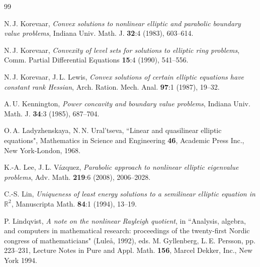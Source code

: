\documentclass[12pt]{amsart}
\numberwithin{equation}{section}
\theoremstyle{plain}
\theoremstyle{plain}
\theoremstyle{plain}
\theoremstyle{definition}
\newcommand{\R}{{\mathbb R}}
\begin{document}
\begin{thebibliography}{99}

N.$\,$J. Korevaar,
\emph{Convex solutions to nonlinear elliptic and parabolic boundary value problems},
Indiana Univ. Math. J. \textbf{32}:4 (1983), 603--614.

N.$\,$J. Korevaar, %
\emph{Convexity of level sets for solutions to elliptic ring problems},
Comm. Partial Differential Equations \textbf{15}:4 (1990), 541--556.

N.$\,$J. Korevaar, J.$\,$L. Lewis, 
 \emph{Convex solutions of certain elliptic equations have constant rank Hessian},
Arch. Ration. Mech. Anal. \textbf{97}:1 (1987), 19--32.

A.$\,$U. Kennington,
\emph{Power concavity and boundary value problems},
Indiana Univ. Math. J. \textbf{34}:3 (1985), 687--704.




O.$\,$A. Ladyzhenskaya, N.$\,$N. Ural'tseva, 
``Linear and quasilinear elliptic equations",
Mathematics in Science and Engineering {\bf 46}, Academic Press Inc., New York-London, 1968.

K.-A. Lee, J.$\,$L. Vázquez,
\emph{Parabolic approach to nonlinear elliptic eigenvalue problems},
Adv. Math. \textbf{219}:6 (2008), 2006--2028.

C.-S. Lin,
\emph{Uniqueness of least energy solutions to a semilinear elliptic equation in $\R^2$},
Manuscripta Math. \textbf{84}:1 (1994), 13--19.

P. Lindqvist,
\emph{A note on the nonlinear Rayleigh quotient}, 
in ``Analysis, algebra, and computers in mathematical research: proceedings of the twenty-first Nordic congress of mathematicians" (Luleå, %
1992), eds. M. Gyllenberg, L.$\,$E. Persson, pp. 223--231, 
Lecture Notes in Pure and Appl. Math. \textbf{156}, Marcel Dekker, Inc., New York 1994.


\end{thebibliography}
\end{document}
